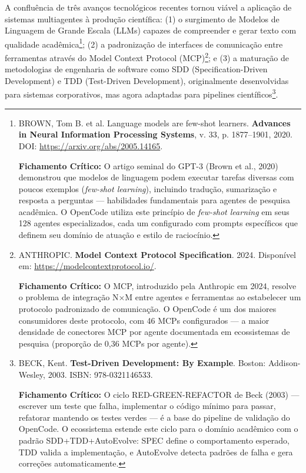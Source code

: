A confluência de três avanços tecnológicos recentes tornou viável a aplicação de sistemas multiagentes à produção científica: (1) o surgimento de Modelos de Linguagem de Grande Escala (LLMs) capazes de compreender e gerar texto com qualidade acadêmica\footnote{
  BROWN, Tom B. et al. Language models are few-shot learners. \textbf{Advances in Neural Information Processing Systems}, v. 33, p. 1877--1901, 2020. DOI: \url{https://arxiv.org/abs/2005.14165}.

  \textbf{Fichamento Crítico:} O artigo seminal do GPT-3 (Brown et al., 2020) demonstrou que modelos de linguagem podem executar tarefas diversas com poucos exemplos (\textit{few-shot learning}), incluindo tradução, sumarização e resposta a perguntas --- habilidades fundamentais para agentes de pesquisa acadêmica. O OpenCode utiliza este princípio de \textit{few-shot learning} em seus 128 agentes especializados, cada um configurado com prompts específicos que definem seu domínio de atuação e estilo de raciocínio.
}; (2) a padronização de interfaces de comunicação entre ferramentas através do Model Context Protocol (MCP)\footnote{
  ANTHROPIC. \textbf{Model Context Protocol Specification}. 2024. Disponível em: \url{https://modelcontextprotocol.io/}.

  \textbf{Fichamento Crítico:} O MCP, introduzido pela Anthropic em 2024, resolve o problema de integração N×M entre agentes e ferramentas ao estabelecer um protocolo padronizado de comunicação. O OpenCode é um dos maiores consumidores deste protocolo, com 46 MCPs configurados --- a maior densidade de conectores MCP por agente documentada em ecossistemas de pesquisa (proporção de 0,36 MCPs por agente).
}; e (3) a maturação de metodologias de engenharia de software como SDD (Specification-Driven Development) e TDD (Test-Driven Development), originalmente desenvolvidas para sistemas corporativos, mas agora adaptadas para pipelines científicos\footnote{
  BECK, Kent. \textbf{Test-Driven Development: By Example}. Boston: Addison-Wesley, 2003. ISBN: 978-0321146533.

  \textbf{Fichamento Crítico:} O ciclo RED-GREEN-REFACTOR de Beck (2003) --- escrever um teste que falha, implementar o código mínimo para passar, refatorar mantendo os testes verdes --- é a base do pipeline de validação do OpenCode. O ecossistema estende este ciclo para o domínio acadêmico com o padrão SDD+\-TDD+\-Auto\-Evolve: SPEC define o comportamento esperado, TDD valida a implementação, e AutoEvolve detecta padrões de falha e gera correções automaticamente.
}.

